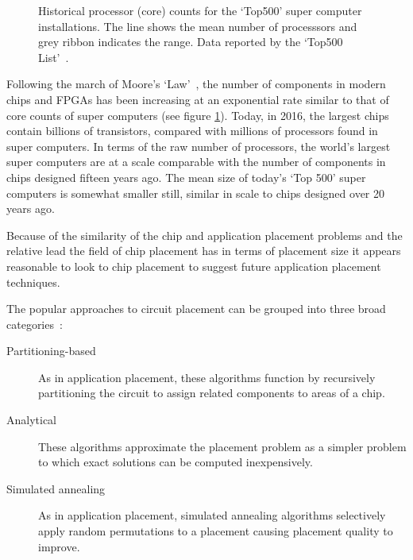 			\begin{figure}
				\center
				
				\caption[Historical core counts for the `Top500' super computers.]%
				{Historical processor (core) counts for the `Top500' super
				computer installations. The line shows the mean number of processsors and
				grey ribbon indicates the range. Data reported by the `Top500
				List'~\cite{meuer16j}.}
				\label{fig:top500-num-processors}
			\end{figure}
			
			Following the march of Moore's `Law'~\cite{moore75}, the number of
			components in modern chips and FPGAs has been increasing at an
			exponential rate similar to that of core counts of super computers (see
			figure \ref{fig:top500-num-processors}). Today, in 2016, the largest
			chips contain billions of transistors, compared with millions of
			processors found in super computers. In terms of the raw number of
			processors, the world's largest super computers are at a scale comparable
			with the number of components in chips designed fifteen years ago. The
			mean size of today's `Top 500' super computers is somewhat smaller still,
			similar in scale to chips designed over 20 years ago.
			
			Because of the similarity of the chip and application placement problems
			and the relative lead the field of chip placement has in terms of
			placement size it appears reasonable to look to chip placement to suggest
			future application placement techniques.
			
			The popular approaches to circuit placement can be grouped into three
			broad categories~\cite{kahng11}:
			
			\begin{description}
				
				\item[Partitioning-based] As in application placement, these algorithms
				function by recursively partitioning the circuit to assign
				related components to areas of a chip.
				
				\item[Analytical] These algorithms approximate the placement problem as
				a simpler problem to which exact solutions can be computed
				inexpensively.
				
				\item[Simulated annealing] As in application placement, simulated
				annealing algorithms selectively apply random permutations to a
				placement causing placement quality to improve.
				
			\end{description}
			
